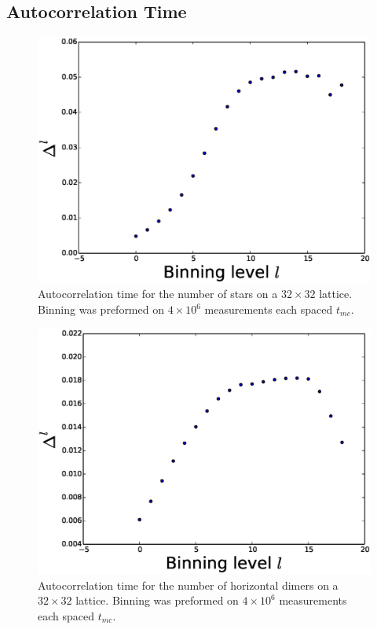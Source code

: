 \documentclass[aps,floatfix,11pt]{revtex4-1}
\begin{document}
\clearpage
\subsection{Autocorrelation Time}

\begin{figure}[h]
    \centering
    \includegraphics[width=8.5 cm]{auto_cor_num_stars}
    \caption{Autocorrelation time for the number of stars on a $32\times 32$ lattice. Binning was preformed on $4\times 10^6$
    measurements each spaced $t_{mc}$. \label{fig:auto_cor_num_stars}}
\end{figure}

\begin{figure}[h]
    \centering
    \includegraphics[width=8.5 cm]{auto_cor_num_horz}
    \caption{Autocorrelation time for the number of horizontal dimers on a $32\times 32$ lattice. Binning was preformed on $4\times 10^6$
    measurements each spaced $t_{mc}$. \label{fig:auto_cor_num_stars}}
\end{figure}
\end{document}

